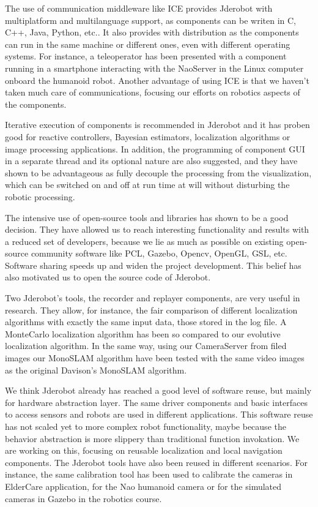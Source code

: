 \documentclass[twocolumn]{svjour3}          %
\begin{document}
The use of communication middleware like ICE provides Jderobot with multiplatform and multilanguage support, as components can be writen in C, C++, Java, Python, etc.. It also provides with distribution as the components can run in the same machine or different ones, even with different operating systems. For instance, a teleoperator has been presented with a component running in a smartphone interacting with the NaoServer in the Linux computer onboard the humanoid robot. Another advantage of using ICE is that we haven't taken much care of communications, focusing our efforts on robotics aspects of the components.

Iterative execution of components is recommended in Jderobot and it has proben good for reactive controllers, Bayesian estimators, localization algorithms or image processing applications. In addition, the programming of component GUI in a separate thread and its optional nature are also suggested, and they have shown to be advantageous as fully decouple the processing from the visualization, which can be switched on and off at run time at will without disturbing the robotic processing.

The intensive use of open-source tools and libraries has shown to be a good decision. They have allowed us to reach interesting functionality and results with a reduced set of developers, because we lie as much as possible on existing open-source community software like PCL, Gazebo, Opencv, OpenGL, GSL, etc. Software sharing speeds up and widen the project development. This belief has also motivated us to open the source code of Jderobot.

Two Jderobot's tools, the recorder and replayer components, are very useful in research. They allow, for instance, the fair comparison of different localization algorithms with exactly the same input data, those stored in the log file. A MonteCarlo localization algorithm has been so compared to our evolutive localization algorithm. In the same way, using our CameraServer from filed images our MonoSLAM algorithm have been tested with the same video images as the original Davison's MonoSLAM algorithm.

We think Jderobot already has reached a good level of software reuse, but mainly for hardware abstraction layer. The same driver components and basic interfaces to access sensors and robots are used in different applications. This software reuse has not scaled yet to more complex robot functionality, maybe because the behavior abstraction is more slippery than traditional function invokation. We are working on this, focusing on reusable localization and local navigation components. The Jderobot tools have also been reused in different scenarios. For instance, the same calibration tool has been used to calibrate the cameras in ElderCare application, for the Nao humanoid camera or for the simulated cameras in Gazebo in the robotics course.
\end{document}
